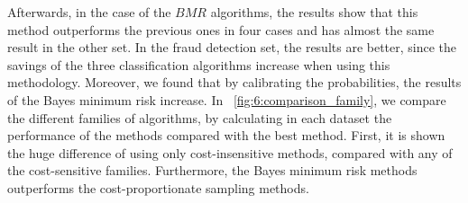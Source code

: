 Afterwards, in the case of the $BMR$ algorithms, the results show that this method outperforms 
the previous ones in four cases and has almost the same result in the other set. In the fraud 
detection  set, the results are better, since the savings of the three classification 
algorithms increase when using this methodology. Moreover, we found that by calibrating the 
probabilities, the results of the Bayes minimum risk increase. In 
\figurename{~\ref{fig:6:comparison_family}}, we compare the different families of algorithms, by 
calculating in each dataset the performance of the methods compared with the best method. First, it 
is shown the huge difference of using only cost-insensitive methods, compared with any of the 
cost-sensitive families. Furthermore, the Bayes minimum risk methods outperforms the 
cost-proportionate sampling methods.

